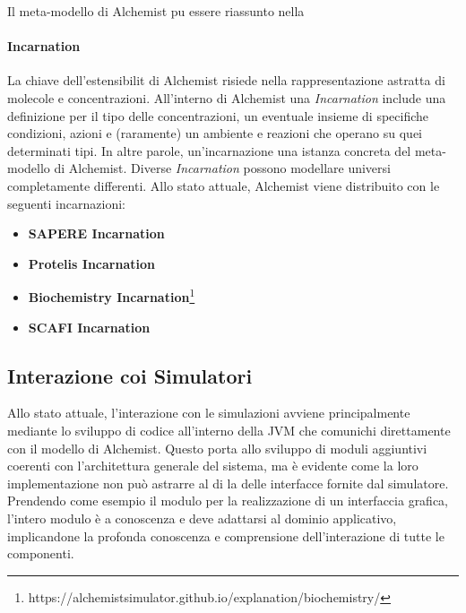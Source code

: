 Il meta-modello di Alchemist pu essere riassunto nella 


\paragraph{Incarnation}\label{}
La chiave dell'estensibilit di Alchemist risiede nella rappresentazione astratta di molecole e concentrazioni.
All'interno di Alchemist una \textit{Incarnation} include una definizione per il tipo delle concentrazioni, un eventuale insieme di specifiche
condizioni, azioni e (raramente) un ambiente e reazioni che operano su quei determinati tipi. In altre parole, un'incarnazione  una
istanza concreta del meta-modello di Alchemist.
%
Diverse \textit{Incarnation} possono modellare universi completamente differenti. Allo stato attuale, Alchemist viene distribuito con le seguenti incarnazioni:
\begin{itemize}
    \item \textbf{SAPERE Incarnation}~\cite{sapere}
    \item \textbf{Protelis Incarnation}~\cite{protelis}
    \item \textbf{Biochemistry Incarnation}\footnote{https://alchemistsimulator.github.io/explanation/biochemistry/}
    \item \textbf{SCAFI Incarnation}~\cite{CASADEI2022101248}
\end{itemize}

\subsection{Interazione coi Simulatori}\label{ssec:sim-interactions}
Allo stato attuale, l'interazione con le simulazioni avviene principalmente mediante lo sviluppo di codice all'interno della \ac{JVM} che comunichi direttamente con il modello di Alchemist.
Questo porta allo sviluppo di moduli aggiuntivi coerenti con l'architettura generale del sistema, ma è evidente come la loro implementazione non può astrarre al di la delle interfacce fornite
dal simulatore. Prendendo come esempio il modulo per la realizzazione di un interfaccia grafica, l'intero modulo è a conoscenza e deve adattarsi al dominio applicativo, implicandone 
la profonda conoscenza e comprensione dell'interazione di tutte le componenti.

